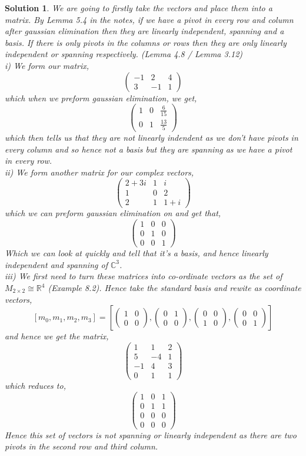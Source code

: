 \documentclass{article}
\newcommand{\R}{\mathbb{R}}
\newcommand{\C}{\mathbb{C}}
\newcommand{\tbt}[4]{\begin{pmatrix} #1 & #2 \\ #3 & #4\end{pmatrix}}
\newcommand{\thbth}[9]{\begin{pmatrix} #1 & #2 & #3 \\ #4 & #5 & #6 \\ #7 & #8 & #9\end{pmatrix}}
\newcommand{\iid}{\thbth 1 0 0 0 1 0 0 0 1}
\newtheorem{solution}{Solution}
\begin{document}
\begin{solution}
  We are going to firstly take the vectors and place them into a matrix. By Lemma 5.4 in the notes, if we have a pivot in every row and column after gaussian elimination then they are linearly independent, spanning and a basis. If there is only pivots in the columns or rows then they are only linearly independent or spanning respectively. (Lemma 4.8 / Lemma 3.12)\\

  \noindent
  i) We form our matrix,
  $$ \begin{pmatrix}
    -1 & 2 & 4 \\ 3 & -1 & 1
  \end{pmatrix}  $$
  which when we preform gaussian elimination, we get,
  $$ \begin{pmatrix}
    1 & 0 & \frac{6}{15}\\ 0 & 1 & \frac{13}{5}
  \end{pmatrix} $$
  which then tells us that they are not linearly indendent as we don't have pivots in every column and so hence not a basis but they are spanning as we have a pivot in every row.\\

  \noindent
  ii) We form another matrix for our complex vectors,
  $$ \thbth {2+3i} 1 i 1 0 2 2 1 {1+i} $$
  which we can preform gaussian elimination on and get that,
  $$ \iid $$
  Which we can look at quickly and tell that it's a basis, and hence linearly independent and spanning of $\C^3$.\\\newpage
  \noindent
  iii) We first need to turn these matrices into co-ordinate vectors as the set of $M_{2\times 2} \cong \R^4$ (Example 8.2). Hence take the standard basis and rewite as coordinate vectors,
  $$ [m_0, m_1, m_2, m_3] = \left[\tbt 1 0 0 0, \tbt 0 1 0 0, \tbt 0 0 1 0, \tbt 0 0 0 1 \right] $$
  and hence we get the matrix,
  $$ \begin{pmatrix}
    1 & 1 & 2 \\ 5 & -4 & 1 \\ -1 & 4 & 3\\ 0 & 1 & 1
  \end{pmatrix} $$
  which reduces to,
  $$ \begin{pmatrix}
    1 & 0 & 1 \\
    0 & 1 & 1 \\
    0 & 0 & 0 \\
    0 & 0 & 0
  \end{pmatrix} $$
  Hence this set of vectors is not spanning or linearly independent as there are two pivots in the second row and third column.\\


\end{solution}
\end{document}
